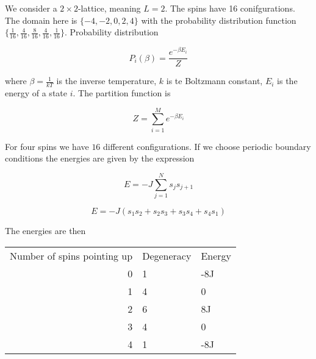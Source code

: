\documentclass[11pt]{article}
\begin{document}
\begin{flushleft}
We consider a $2 \times 2$-lattice, meaning $L = 2$. The spins have 16 conifgurations. The domain here is $\{-4,-2,0,2,4\}$ with the probability distribution function $\{\frac{1}{16}, \frac{4}{16},\frac{8}{16} ,\frac{4}{16}, \frac{1}{16}\}$. Probability distribution

\begin{equation}
P_i(\beta) = \frac{e^{- \beta E_i}}{Z}
\end{equation}

where $\beta = \frac{1}{kT}$ is the inverse temperature, $k$ is te Boltzmann constant, $E_i$ is the energy of a state $i$. The partition function is 

\begin{equation}\label{Partition function}
Z = \sum_{i=1}^M e^{- \beta E_i}
\end{equation}


For four spins we have $16$ different configurations. If we choose periodic boundary conditions the energies are given by the expression

\begin{equation}
E = -J \sum_{j=1}^N s_j s_{j+1}
\end{equation}

\begin{equation*}
E = -J (s_1 s_2 + s_2 s_3 + s_3 s_4 + s_4 s_1)
\end{equation*}

The energies are then

\begin{tabular}{r|l|l}
Number of spins pointing up & Degeneracy & Energy\\
0 & 1 &  -8J\\
1 & 4 & 0\\
2 & 6 & 8J\\
3 & 4 & 0\\
4 & 1 & -8J\\
\end{tabular}

\end{flushleft}
\end{document}
